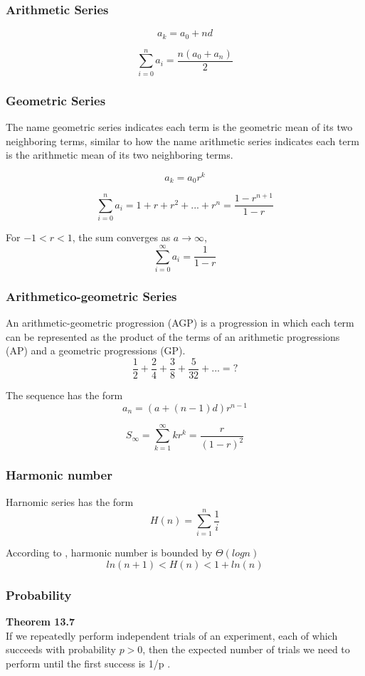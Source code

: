 \documentclass[12pt,article]{article}
\newenvironment{theorem}[2][Theorem]
    { \begin{mdframed}[backgroundcolor=blue!10] \textbf{#1 #2} \\}
    {  \end{mdframed}}
\begin{document}
\subsubsection{Arithmetic Series}

$$a_k = a_0 + nd$$

$$\sum^{n}_{i=0}a_i = \frac{n(a_0 + a_n)}{2}$$

\subsubsection{Geometric Series}
The name geometric series indicates each term is the geometric mean of its two neighboring terms, similar to how the name arithmetic series indicates each term is the arithmetic mean of its two neighboring terms.

$$a_k = a_0 r^k$$

$$\sum^{n}_{i=0}a_i = 1 + r + r^2 + ... + r^n = \frac{1 - r^{n+1}}{1 - r}$$

For $-1 < r < 1$, the sum converges as $a \rightarrow \infty$, 
$$\sum^{\infty}_{i=0}a_i = \frac{1}{1 - r}$$

\subsubsection{Arithmetico-geometric Series}

An arithmetic-geometric progression (AGP) is a progression in which each term can be represented as the product of the terms of an arithmetic progressions (AP) and a geometric progressions (GP).
$$\frac{1}{2} + \frac{2}{4} + \frac{3}{8} + \frac{5}{32} + ... = ?$$

The sequence has the form
$$a_n = (a + (n-1)d)r^{n-1}$$

$$S_{\infty} = \sum^{\infty}_{k=1} kr^k = \frac{r}{(1-r)^2}$$

\subsubsection{Harmonic number}
Harnomic series has the form
$$H(n) = \sum_{i=1}^{n} \frac{1}{i}$$

According to \cite{kleinbergalgorithm}, harmonic number is bounded by $\Theta(logn)$
$$ln(n + 1) < H(n) < 1 + ln(n)$$

\subsubsection{Probability}

\begin{theorem}{13.7}
If we repeatedly perform independent trials of an experiment, each of
which succeeds with probability $p > 0$, then the expected number of trials we
need to perform until the first success is 1/p \cite{kleinbergalgorithm}.
    
\end{theorem}
\end{document}
